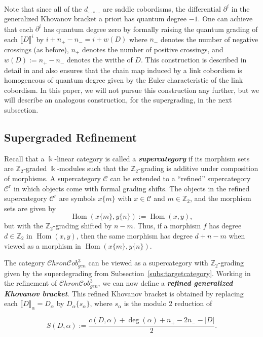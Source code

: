 \documentclass[12pt]{amsart}
\theoremstyle{definition}
\theoremstyle{plain}
\newcommand{\defw}[1]{{\bf{\textit{#1}}}}
\newcommand{\cobIIIgen}{\mathcal{C}hron\mathcal{C}ob^3_{gen}}
\begin{document}
Note that since all of the $d_{\ldots{\star}\ldots}$ are saddle cobordisms, the differential $\partial^i$ in the generalized
Khovanov bracket a priori has quantum degree $-1$. One can achieve that each $\partial^i$ has quantum degree zero
by formally raising the quantum grading of each $\llbracket D\rrbracket^i$ by $i+n_+-n_-=i+w(D)$ where 
$n_-$ denotes the number of negative crossings (as before), $n_+$ denotes the number of positive crossings, 
and $w(D):=n_+-n_-$ denotes the writhe of $D$.
This construction is described in detail in \cite{Bn2005}
and also ensures that the chain map induced by a link cobordism
is homogeneous of quantum degree given by the Euler characteristic of the link cobordism.
In this paper, we will not pursue this construction any further, but we will
describe an analogous construction, for the supergrading, in the next subsection.


\subsection{Supergraded Refinement}\label{subs:supergraded}

Recall that a $\Bbbk$-linear category is called a \defw{supercategory} if
its morphism sets are $\mathbb{Z}_2$-graded $\Bbbk$-modules
such that the $\mathbb{Z}_2$-grading is additive under composition of morphisms.
A supercategory $\mathcal{C}$ can be extended to a \enquote{refined} supercategory $\mathcal{C}^r$
in which objects come with formal grading shifts.
The objects in the refined supercategory $\mathcal{C}^r$ are symbols $x\{m\}$ with $x\in\mathcal{C}$
and $m\in\mathbb{Z}_2$, and the morphism sets are given by
\[
\operatorname{Hom}(x\{m\},y\{n\}):=\operatorname{Hom}(x,y),
\]
but with the $\mathbb{Z}_2$-grading shifted by $n-m$. Thus, if a morphism $f$
has degree $d\in\mathbb{Z}_2$ in $\operatorname{Hom}(x,y)$, then the same morphism has degree $d+n-m$
when viewed as a morphism in $\operatorname{Hom}(x\{m\},y\{n\})$.

The category $\cobIIIgen$ can be viewed as a supercategory with $\mathbb{Z}_2$-grading given by the superdegrading from Subsection~\ref{subs:targetcategory}.
Working in the refinement of $\cobIIIgen$, we can now define a \defw{refined generalized Khovanov bracket}.
This refined Khovanov bracket is obtained by replacing each $\llbracket D\rrbracket_\alpha=D_\alpha$
by $D_\alpha\{s_\alpha\}$, where $s_\alpha$ is the modulo 2 reduction of

\begin{equation}\label{eq:3:Smap}
S(D,\alpha):=\frac{c(D,\alpha)+\deg(\alpha)+n_+ - 2n_- -|D|}{2}.
\end{equation}
\end{document}
